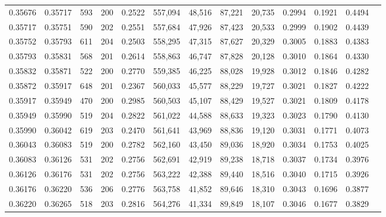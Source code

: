\begin{tabular}{rrrrrrrrrrrrr}
0.35676 & 0.35717 &   593 & 200 &                                     0.2522 & 557,094 &  48,516 &  87,221 &  20,735 & 0.2994 & 0.1921 & 0.4494 \\
0.35717 & 0.35751 &   590 & 202 &                                     0.2551 & 557,684 &  47,926 &  87,423 &  20,533 & 0.2999 & 0.1902 & 0.4439 \\
0.35752 & 0.35793 &   611 & 204 &                                     0.2503 & 558,295 &  47,315 &  87,627 &  20,329 & 0.3005 & 0.1883 & 0.4383 \\
0.35793 & 0.35831 &   568 & 201 &                                     0.2614 & 558,863 &  46,747 &  87,828 &  20,128 & 0.3010 & 0.1864 & 0.4330 \\
0.35832 & 0.35871 &   522 & 200 &                                     0.2770 & 559,385 &  46,225 &  88,028 &  19,928 & 0.3012 & 0.1846 & 0.4282 \\
0.35872 & 0.35917 &   648 & 201 &                                     0.2367 & 560,033 &  45,577 &  88,229 &  19,727 & 0.3021 & 0.1827 & 0.4222 \\
0.35917 & 0.35949 &   470 & 200 &                                     0.2985 & 560,503 &  45,107 &  88,429 &  19,527 & 0.3021 & 0.1809 & 0.4178 \\
0.35949 & 0.35990 &   519 & 204 &                                     0.2822 & 561,022 &  44,588 &  88,633 &  19,323 & 0.3023 & 0.1790 & 0.4130 \\
0.35990 & 0.36042 &   619 & 203 &                                     0.2470 & 561,641 &  43,969 &  88,836 &  19,120 & 0.3031 & 0.1771 & 0.4073 \\
0.36043 & 0.36083 &   519 & 200 &                                     0.2782 & 562,160 &  43,450 &  89,036 &  18,920 & 0.3034 & 0.1753 & 0.4025 \\
0.36083 & 0.36126 &   531 & 202 &                                     0.2756 & 562,691 &  42,919 &  89,238 &  18,718 & 0.3037 & 0.1734 & 0.3976 \\
0.36126 & 0.36176 &   531 & 202 &                                     0.2756 & 563,222 &  42,388 &  89,440 &  18,516 & 0.3040 & 0.1715 & 0.3926 \\
0.36176 & 0.36220 &   536 & 206 &                                     0.2776 & 563,758 &  41,852 &  89,646 &  18,310 & 0.3043 & 0.1696 & 0.3877 \\
0.36220 & 0.36265 &   518 & 203 &                                     0.2816 & 564,276 &  41,334 &  89,849 &  18,107 & 0.3046 & 0.1677 & 0.3829 \\

\end{tabular}
